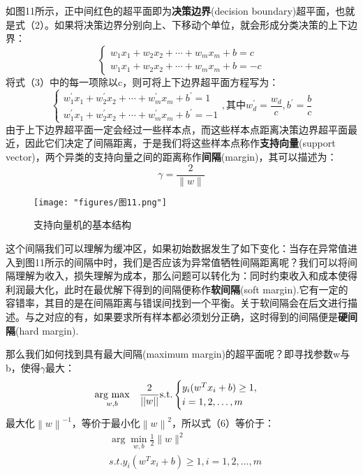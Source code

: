 如图11所示，正中间红色的超平面即为\textbf{决策边界}(decision boundary)超平面，也就是式（2）。如果将决策边界分别向上、下移动个单位，就会形成分类决策的上下边界：
\begin{equation}\begin{cases}w_1x_1+w_2x_2+\cdots+w_mx_m+b=c\\w_1x_1+w_2x_2+\cdots+w_mx_m+b=-c\end{cases}\end{equation}
将式（3）中的每一项除以c，则可将上下边界超平面方程写为：
\begin{equation}\begin{cases}w_1^{\prime}x_1+w_2^{\prime}x_2+\cdots+w_m^{\prime}x_m+b^{\prime}=1\\w_1^{\prime}x_1+w_2^{\prime}x_2+\cdots+w_m^{\prime}x_m+b^{\prime}=-1\end{cases},\text{其中}w_d^{\prime}=\frac{w_d}c,b^{\prime}=\frac bc\end{equation}
由于上下边界超平面一定会经过一些样本点，而这些样本点距离决策边界超平面最近，因此它们决定了间隔距离，于是我们将这些样本点称作\textbf{支持向量}(support vector)，两个异类的支持向量之间的距离称作\textbf{间隔}(margin)，其可以描述为：
\begin{equation}\gamma=\frac2{\|w\|}\end{equation}
\begin{figure}[ht] %
	\centering
	\texttt{[image: "figures/图11.png"]} %
	\caption{支持向量机的基本结构} %
	\label{fig:example} %
\end{figure}

这个间隔我们可以理解为缓冲区，如果初始数据发生了如下变化：当存在异常值进入到图11所示的间隔中时，我们是否应该为异常值牺牲间隔距离呢？我们可以将间隔理解为收入，损失理解为成本，那么问题可以转化为：同时约束收入和成本使得利润最大化，此时在最优解下得到的间隔便称作\textbf{软间隔}(soft margin).它有一定的容错率，其目的是在间隔距离与错误间找到一个平衡。关于软间隔会在后文进行描述。与之对应的有，如果要求所有样本都必须划分正确，这时得到的间隔便是\textbf{硬间隔}(hard margin).

那么我们如何找到具有最大间隔(maximum margin)的超平面呢？即寻找参数w与b，使得$\gamma $最大：
\begin{equation}
	\underset{w, b}{\text{arg max}} \quad \frac{2}{||w||} \\
	\text{s.t.} \begin{cases}
		y_i (w^T x_i + b) \geq 1, \\
		i = 1, 2, \ldots, m
	\end{cases}
\end{equation}
最大化$\left\|w\right\|^{-1}$，等价于最小化$\left\|w\right\|^{2}$，所以式（6）等价于：
\begin{equation}\begin{aligned}&\arg\min_{w,b}\frac12\|w\|^2\\&s.t.y_i(w^Tx_i+b)\geq1,i=1,2,\ldots,m\end{aligned}\end{equation}

